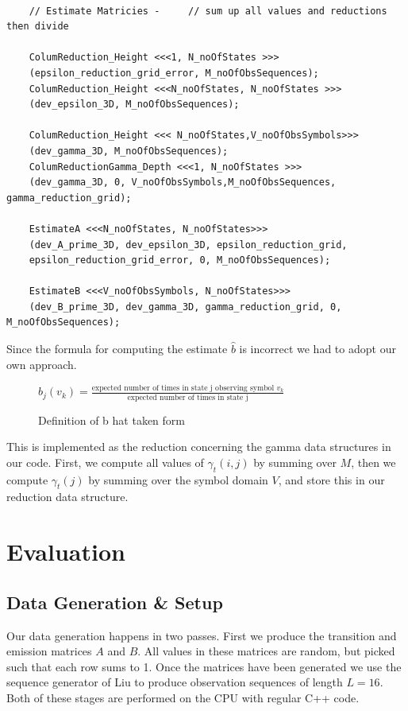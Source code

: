 \documentclass[english, paper=a4]{scrartcl}
\begin{document}
		\begin{verbatim}
	
	// Estimate Matricies - 	// sum up all values and reductions then divide

	ColumReduction_Height <<<1, N_noOfStates >>>
	(epsilon_reduction_grid_error, M_noOfObsSequences);
	ColumReduction_Height <<<N_noOfStates, N_noOfStates >>>
	(dev_epsilon_3D, M_noOfObsSequences);

	ColumReduction_Height <<< N_noOfStates,V_noOfObsSymbols>>>
	(dev_gamma_3D, M_noOfObsSequences);
	ColumReductionGamma_Depth <<<1, N_noOfStates >>>
	(dev_gamma_3D, 0, V_noOfObsSymbols,M_noOfObsSequences, gamma_reduction_grid);

	EstimateA <<<N_noOfStates, N_noOfStates>>>
	(dev_A_prime_3D, dev_epsilon_3D, epsilon_reduction_grid, 
	epsilon_reduction_grid_error, 0, M_noOfObsSequences);

	EstimateB <<<V_noOfObsSymbols, N_noOfStates>>>
	(dev_B_prime_3D, dev_gamma_3D, gamma_reduction_grid, 0, M_noOfObsSequences);
\end{verbatim}

Since the formula for computing the estimate \(\hat{b}\) is incorrect we had to adopt our own approach.

\begin{figure}

\centering

\( \hat{b}_j(v_k) = \frac{\text{expected number of times in state j observing symbol } v_k}{\text{expected number of times in state j}} \)
\caption{Definition of b hat taken form \cite{hmm}}

\end{figure}

This is implemented as the reduction concerning the gamma data structures in our code. First, we compute all values of \(\gamma_t(i,j)\) by summing over \(M\), then we compute \(\gamma_t(j)\) by summing over the symbol domain \(V\), and store this in our reduction data structure.

\section{Evaluation}

\subsection{Data Generation \& Setup}

Our data generation happens in two passes. First we produce the transition and emission matrices $A$ and $B$. All values in these matrices are random, but picked such that each row sums to 1. Once the matrices have been generated we use the sequence generator of Liu \cite{hmm} to produce observation sequences of length $L = 16$. Both of these stages are performed on the CPU with regular C++ code.
\end{document}
